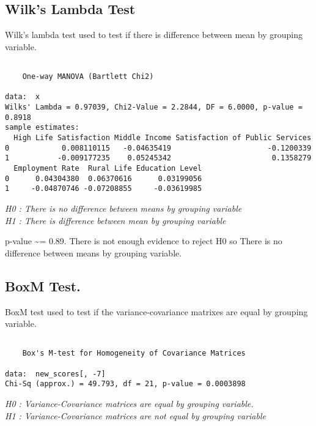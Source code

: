 \documentclass[12pt,twoside]{deuthesis}
\newenvironment{Shaded}{\begin{snugshade}}{\end{snugshade}}
\newcommand{\AttributeTok}[1]{\textcolor[rgb]{0.77,0.63,0.00}{#1}}
\newcommand{\DecValTok}[1]{\textcolor[rgb]{0.00,0.00,0.81}{#1}}
\newcommand{\FunctionTok}[1]{\textcolor[rgb]{0.00,0.00,0.00}{#1}}
\newcommand{\NormalTok}[1]{#1}
\newcommand{\SpecialCharTok}[1]{\textcolor[rgb]{0.00,0.00,0.00}{#1}}
\newcommand{\StringTok}[1]{\textcolor[rgb]{0.31,0.60,0.02}{#1}}
\begin{document}
\hypertarget{wilks-lambda-test}{%
\subsection{Wilk's Lambda Test}\label{wilks-lambda-test}}

Wilk's lambda test used to test if there is difference between mean by grouping variable.
\begin{Shaded}
\end{Shaded}
\begin{verbatim}

    One-way MANOVA (Bartlett Chi2)

data:  x
Wilks' Lambda = 0.97039, Chi2-Value = 2.2844, DF = 6.0000, p-value =
0.8918
sample estimates:
  High Life Satisfaction Middle Income Satisfaction of Public Services
0            0.008110115   -0.04635419                      -0.1200339
1           -0.009177235    0.05245342                       0.1358279
  Employment Rate  Rural Life Education Level
0      0.04304380  0.06370616      0.03199056
1     -0.04870746 -0.07208855     -0.03619985
\end{verbatim}
\emph{H0 : There is no difference between means by grouping variable}\\
\setlength{\parindent}{0in}
\emph{H1 : There is difference between mean by grouping variable}

p-value \textasciitilde= 0.89. There is not enough evidence to reject H0 so There is no difference between means by grouping variable.

\hypertarget{boxm-test.}{%
\subsection{BoxM Test.}\label{boxm-test.}}

BoxM test used to test if the variance-covariance matrixes are equal by grouping variable.
\begin{Shaded}
\end{Shaded}
\begin{verbatim}

    Box's M-test for Homogeneity of Covariance Matrices

data:  new_scores[, -7]
Chi-Sq (approx.) = 49.793, df = 21, p-value = 0.0003898
\end{verbatim}
\emph{H0 : Variance-Covariance matrices are equal by grouping variable.}\\
\setlength{\parskip}{0in}
\emph{H1 : Variance-Covariance matrices are not equal by grouping variable}
\end{document}
